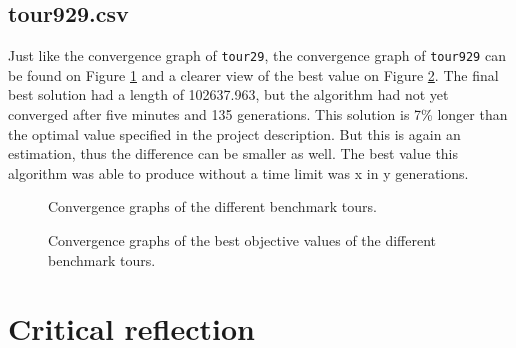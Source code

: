 \documentclass[a4paper,10pt]{article}
\newcommand{\ReplaceMe}[1]{{\color{blue}#1}}
\newcommand{\RemoveMe}[1]{{\color{purple}#1}}
\begin{document}
\subsection{tour929.csv}

%
%
%

Just like the convergence graph of \texttt{tour29}, the convergence graph of \texttt{tour929} can be found on Figure \ref{fig:graphs} and a clearer view of the best value on Figure \ref{fig:best}. The final best solution had a length of 102637.963, but the algorithm had not yet converged after five minutes and 135 generations. This solution is 7\% longer than the optimal value specified in the project description. But this is again an estimation, thus the difference can be smaller as well. The best value this algorithm was able to produce without a time limit was \ReplaceMe{x} in \ReplaceMe{y} generations.

\begin{figure}[p]
\centering
{}
\caption{Convergence graphs of the different benchmark tours.}
\label{fig:graphs}
\end{figure}

\begin{figure}[p]
\centering
{}
\caption{Convergence graphs of the best objective values of the different benchmark tours.}
\label{fig:best}
\end{figure}

\section{Critical reflection}


\end{document}
